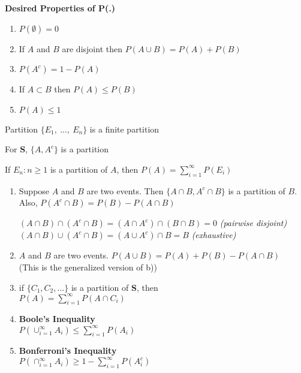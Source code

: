\documentclass[12pt, oneside, letterpaper]{notes}
\begin{document}
\begin{remark}
\textbf{Desired Properties of P(.)}
\begin{enumerate}
	\item $P(\emptyset) = 0$
	\item If $A$ and $B$ are disjoint then $P(A \cup B) = P(A) + P(B)$
	\item $P(A^c) = 1- P(A)$
	\item If $A \subset B$ then $P(A) \leq P(B)$
	\item $P(A) \leq 1$
\end{enumerate}
\end{remark}

%
%

\begin{remark}
	Partition $\{E_1, \: ..., \: E_n \}$ is a finite partition
\end{remark}

\begin{remark}
	For \textbf{S}, $\{A, A^c\}$ is a partition
\end{remark}

\begin{remark}
	If $E_n: n \geq 1$ is a partition of $A$, then $P(A) = \sum_{i=1}^{\infty} P(E_i)$
\end{remark}

\begin{enumerate}
	\item Suppose $A$ and $B$ are two events.  Then $\{A \cap B, A^c \cap B\}$
	is a partition of $B$.  Also, $P(A^c \cap B) = P(B) - P(A \cap B)$ 

	\begin{myproof}
		$(A \cap B) \cap (A^c \cap B) = 
		(A \cap A^c) \cap (B \cap B) = 0$  \textit{(pairwise disjoint)} \\
		$(A \cap B) \cup (A^c \cap B) = (A \cup A^c) \cap B = B $ 
		\textit{(exhaustive)} 
	\end{myproof}

	\item $A$ and $B$ are two events.  $P(A \cup B) = P(A) + P(B) - P(A \cap B)$ \\
	(This is the generalized version of b)) 

	\item if $\{C_1, C_2, ... \}$ is a partition of \textbf{S}, then \\
	$P(A) = \sum_{i=1}^{\infty} P(A \cap C_i)$ 

	\item\textbf{Boole's Inequality} \\
	\indent $P(\cup_{i=1}^{\infty} A_i) \leq \sum_{i=1}^{\infty}P(A_i)$ 
	
	\item \textbf{Bonferroni's Inequality}\\
	$P(\cap_{i=1}^{\infty} A_i) \geq 1 - \sum_{i=1}^{\infty} P(A_i^c)$
\end{enumerate}
\end{document}
